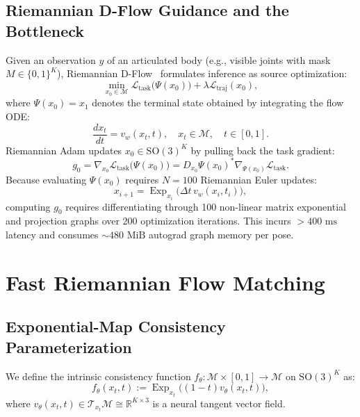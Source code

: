 \documentclass[10pt,twocolumn,letterpaper]{article}
\DeclareMathOperator{\Exp}{Exp}
\begin{document}
\subsection{Riemannian D-Flow Guidance and the Bottleneck}
Given an observation $y$ of an articulated body (e.g., visible joints with mask $M \in \{0, 1\}^K$), Riemannian D-Flow~\cite{benhamu2024dflow,nadar2026posedflow} formulates inference as source optimization:
\begin{equation}
\min_{x_0 \in \mathcal{M}} \mathcal{L}_{\mathrm{task}}\big(\Psi(x_0)\big) + \lambda \mathcal{L}_{\mathrm{traj}}(x_0),
\end{equation}
where $\Psi(x_0) = x_1$ denotes the terminal state obtained by integrating the flow ODE:
\begin{equation}
\frac{d x_t}{dt} = v_w(x_t, t), \quad x_t \in \mathcal{M}, \quad t \in [0, 1].
\end{equation}
Riemannian Adam updates $x_0 \in \mathrm{SO}(3)^K$ by pulling back the task gradient:
\begin{equation}
g_0 = \nabla_{x_0} \mathcal{L}_{\mathrm{task}}\big(\Psi(x_0)\big) = D_{x_0}\Psi(x_0)^* \nabla_{\Psi(x_0)} \mathcal{L}_{\mathrm{task}}.
\end{equation}
Because evaluating $\Psi(x_0)$ requires $N=100$ Riemannian Euler updates:
\begin{equation}
x_{i+1} = \Exp_{x_i}\big(\Delta t \, v_w(x_i, t_i)\big),
\end{equation}
computing $g_0$ requires differentiating through 100 non-linear matrix exponential and projection graphs over 200 optimization iterations. This incurs $>400\text{ ms}$ latency and consumes $\sim 480\text{ MiB}$ autograd graph memory per pose.

\section{Fast Riemannian Flow Matching}

\subsection{Exponential-Map Consistency Parameterization}
We define the intrinsic consistency function $f_\theta : \mathcal{M} \times [0, 1] \to \mathcal{M}$ on $\mathrm{SO}(3)^K$ as:
\begin{equation}
f_\theta(x_t, t) := \Exp_{x_t}\big( (1 - t) v_\theta(x_t, t) \big),
\label{eq:rcm_param}
\end{equation}
where $v_\theta(x_t, t) \in \mathcal{T}_{x_t}\mathcal{M} \cong \mathbb{R}^{K \times 3}$ is a neural tangent vector field.
\end{document}
